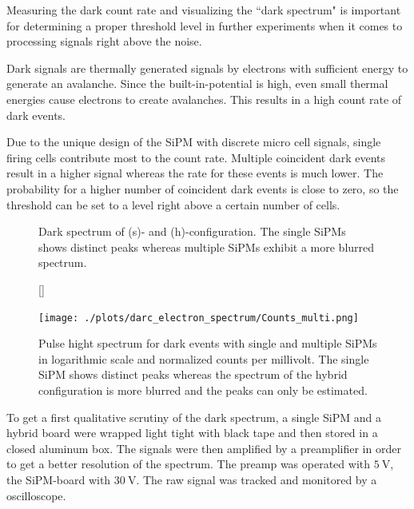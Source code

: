 Measuring the dark count rate and visualizing the ``dark spectrum" is important for determining a proper threshold level in further experiments when it comes to processing signals right above the noise. \par 
Dark signals are thermally generated signals by electrons with sufficient energy to generate an avalanche. Since the built-in-potential is high, even small thermal energies cause electrons to create avalanches. This results in a high count rate of dark events. \par 
Due to the unique design of the SiPM with discrete micro cell signals, single firing cells contribute most to the count rate. Multiple coincident dark events result in a higher signal whereas the rate for these events is much lower. The probability for a higher number of coincident dark events is close to zero, so the threshold can be set to a level right above a certain number of cells. \par 
\begin{figure}[t]
	\hfill
	\hfill
	\caption[Dark spectrum of single and multiple SiPM-configurations]{Dark spectrum of (s)- and (h)-configuration. The single SiPMs shows distinct peaks whereas multiple SiPMs exhibit a more blurred spectrum.}
	\label{fig:ch4:darc_spectrum}
\end{figure}
\begin{figure}[b!]
	[\FBwidth]
	{\caption[Pulse hight spectrum]{Pulse hight spectrum for dark events with single and multiple SiPMs in logarithmic scale and normalized counts per millivolt. The single SiPM shows distinct peaks whereas the spectrum of the hybrid configuration is more blurred and the peaks can only be estimated. }    
		\label{fig:ch4:pulse_hight_hist}}
	{\texttt{[image: ./plots/darc\_electron\_spectrum/Counts\_multi.png]}}
\end{figure}
To get a first qualitative scrutiny of the dark spectrum, a single SiPM and a hybrid board were wrapped light tight with black tape and then stored in a closed aluminum box. The signals were then amplified by a preamplifier in order to get a better resolution of the spectrum. The preamp was operated with $\SI{5}{\volt}$, the SiPM-board with $\SI{30}{\volt}$. The raw signal was tracked and monitored by a  oscilloscope. \par 
